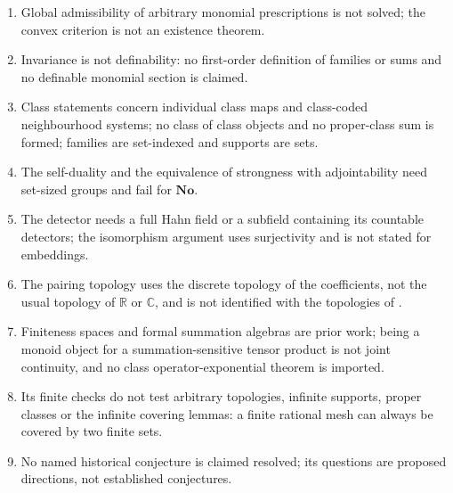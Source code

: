 \documentclass[11pt,oneside]{article}
\numberwithin{equation}{section}
\theoremstyle{definition}
\theoremstyle{remark}
\newcommand{\No}{\mathbf{No}}
\newcommand{\R}{\mathbb R}
\newcommand{\C}{\mathbb C}
\begin{document}
\begin{enumerate}[itemsep=1pt]
\item Global admissibility of arbitrary monomial prescriptions is not solved; the convex criterion is not an
existence theorem.
\item Invariance is not definability: no first-order definition of families or sums and no definable monomial
section is claimed.
\item Class statements concern individual class maps and class-coded neighbourhood systems; no class of class
objects and no proper-class sum is formed; families are set-indexed and supports are sets.
\item The self-duality and the equivalence of strongness with adjointability need set-sized groups and fail for
$\No$.
\item The detector needs a full Hahn field or a subfield containing its countable detectors; the isomorphism
argument uses surjectivity and is not stated for embeddings.
\item The pairing topology uses the discrete topology of the coefficients, not the usual topology of $\R$ or
$\C$, and is not identified with the topologies of \cite{FS}.
\item Finiteness spaces and formal summation algebras \cite{BCJS,BKKPS} are prior work; being a monoid object for a
summation-sensitive tensor product is not joint continuity, and no class operator-exponential theorem is imported.
\item Its finite checks do not test arbitrary topologies, infinite supports, proper classes or the infinite
covering lemmas: a finite rational mesh can always be covered by two finite sets.
\item No named historical conjecture is claimed resolved; its questions are proposed directions, not
established conjectures.
\end{enumerate}
\end{document}

